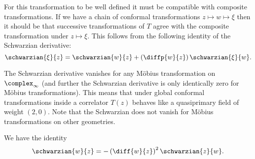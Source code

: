 \documentclass[fleqn]{NotesClass}
\begin{document}
    For this transformation to be well defined it must be compatible with composite transformations.
    If we have a chain of conformal transformations \(z \mapsto w \mapsto \xi\) then it should be that successive transformations of \(T\) agree with the composite transformation under \(z \mapsto \xi\).
    This follows from the following identity of the Schwarzian derivative:
    \begin{equation}
        \schwarzian{\xi}{z} = \schwarzian{w}{z} + \left( \diffp{w}{z} \right) \schwarzian{\xi}{w}.
    \end{equation}
    
    The Schwarzian derivative vanishes for any M\"obius transformation on \(\complex_{\infty}\) (and further the Schwarzian derivative is only identically zero for M\"obius transformations).
    This means that under global conformal transformations inside a correlator \(T(z)\) behaves like a quasiprimary field of weight \((2, 0)\).
    Note that the Schwarzian does not vanish for M\"obius transformations on other geometries.
    
    We have the identity
    \begin{equation}
        \schwarzian{w}{z} = -\left( \diff{w}{z} \right)^2 \schwarzian{z}{w}.
    \end{equation}
    
    
    
\end{document}
